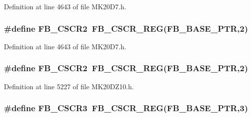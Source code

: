 Definition at line 4643 of file M\+K20\+D7.\+h.

\subsubsection[{\texorpdfstring{F\+B\+\_\+\+C\+S\+C\+R2}{FB_CSCR2}}]{\setlength{\rightskip}{0pt plus 5cm}\#define F\+B\+\_\+\+C\+S\+C\+R2~{\bf F\+B\+\_\+\+C\+S\+C\+R\+\_\+\+R\+EG}({\bf F\+B\+\_\+\+B\+A\+S\+E\+\_\+\+P\+TR},2)}\hypertarget{group___f_b___register___accessor___macros_ga83a40f5cce744e6d9010a2d44a1bdbe0}{}\label{group___f_b___register___accessor___macros_ga83a40f5cce744e6d9010a2d44a1bdbe0}


Definition at line 4643 of file M\+K20\+D7.\+h.

\subsubsection[{\texorpdfstring{F\+B\+\_\+\+C\+S\+C\+R2}{FB_CSCR2}}]{\setlength{\rightskip}{0pt plus 5cm}\#define F\+B\+\_\+\+C\+S\+C\+R2~{\bf F\+B\+\_\+\+C\+S\+C\+R\+\_\+\+R\+EG}({\bf F\+B\+\_\+\+B\+A\+S\+E\+\_\+\+P\+TR},2)}\hypertarget{group___f_b___register___accessor___macros_ga83a40f5cce744e6d9010a2d44a1bdbe0}{}\label{group___f_b___register___accessor___macros_ga83a40f5cce744e6d9010a2d44a1bdbe0}


Definition at line 5227 of file M\+K20\+D\+Z10.\+h.

\subsubsection[{\texorpdfstring{F\+B\+\_\+\+C\+S\+C\+R3}{FB_CSCR3}}]{\setlength{\rightskip}{0pt plus 5cm}\#define F\+B\+\_\+\+C\+S\+C\+R3~{\bf F\+B\+\_\+\+C\+S\+C\+R\+\_\+\+R\+EG}({\bf F\+B\+\_\+\+B\+A\+S\+E\+\_\+\+P\+TR},3)}\hypertarget{group___f_b___register___accessor___macros_gab8dddf42dec6c5d0c457ea947b335e78}{}\label{group___f_b___register___accessor___macros_gab8dddf42dec6c5d0c457ea947b335e78}


